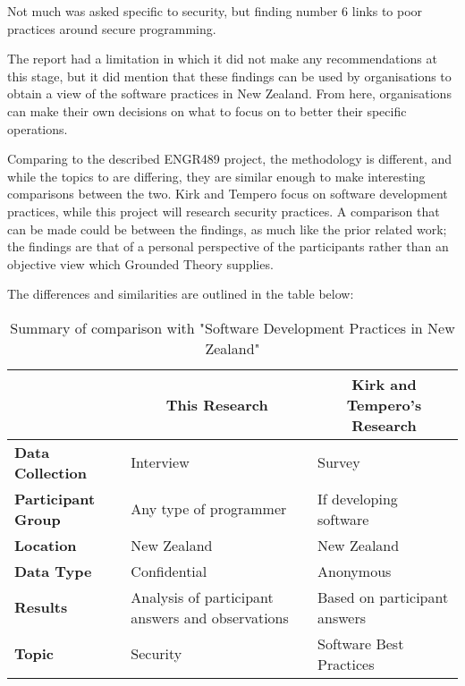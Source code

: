 \par Not much was asked specific to security, but finding number 6 links to poor practices around secure programming. 
\newline
\par The report had a limitation in which it did not make any recommendations at this stage, but it did mention that these findings can be used by organisations to obtain a view of the software practices in New Zealand. From here, organisations can make their own decisions on what to focus on to better their specific operations.  
\newline
\par Comparing to the described ENGR489 project, the methodology is different, and while the topics to are differing, they are similar enough to make interesting comparisons between the two. Kirk and Tempero focus on software development practices, while this project will research security practices. A comparison that can be made could be between the findings, as much like the prior related work; the findings are that of a personal perspective of the participants rather than an objective view which Grounded Theory supplies.
\newline
\par The differences and similarities are outlined in the table below:
\newline
\newline
\begin{table}[htb]
\begin{tabular}{|l|l|l|}
\hline
\multicolumn{1}{|c|}{} &
\multicolumn{1}{|c|}{\textbf{This Research}}             & \multicolumn{1}{c|}{\textbf{Kirk and Tempero's Research}} \\ \hline
\textbf{Data Collection} & Interview                 & Survey                  \\ \hline
\textbf{Participant Group}                  & Any type of programmer  & If developing software           \\ \hline
\textbf{Location}             & New Zealand         & New Zealand      \\ \hline
\textbf{Data Type}     & Confidential & Anonymous  \\ \hline
\textbf{Results}              & Analysis of participant answers and observations & Based on participant answers                 \\ \hline
\textbf{Topic}                & Security                  & Software Best Practices \\ \hline
\end{tabular}
\centering
\newline
\caption{Summary of comparison with "Software Development Practices in New Zealand"}
\centering
\end{table}







